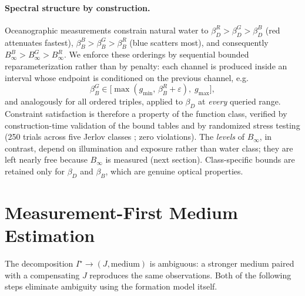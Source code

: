\documentclass[11pt,a4paper]{article}
\newcommand{\Binf}{B_\infty}
\newcommand{\J}{J}
\newcommand{\I}{I}
\begin{document}
\paragraph{Spectral structure by construction.}
Oceanographic measurements \cite{jerlov1976marine} constrain natural water to $\beta_D^R > \beta_D^G > \beta_D^B$ (red attenuates fastest), $\beta_B^B > \beta_B^G > \beta_B^R$ (blue scatters most), and consequently $\Binf^B > \Binf^G > \Binf^R$. We enforce these orderings by sequential bounded reparameterization rather than by penalty: each channel is produced inside an interval whose endpoint is conditioned on the previous channel, e.g.
\begin{equation}
    \beta_B^G \in \big[\max(g_{\min},\, \beta_B^R + \varepsilon),\; g_{\max}\big],
\end{equation}
and analogously for all ordered triples, applied to $\beta_D$ at \emph{every} queried range. Constraint satisfaction is therefore a property of the function class, verified by construction-time validation of the bound tables and by randomized stress testing (250 trials across five Jerlov classes \cite{jerlov1976marine}; zero violations). The \emph{levels} of $\Binf$, in contrast, depend on illumination and exposure rather than water class; they are left nearly free because $\Binf$ is measured (next section). Class-specific bounds are retained only for $\beta_D$ and $\beta_B$, which are genuine optical properties.

\section{Measurement-First Medium Estimation}
\label{sec:measurement}

The decomposition $\I^\star \to (\J, \text{medium})$ is ambiguous: a stronger medium paired with a compensating $\J$ reproduces the same observations. Both of the following steps eliminate ambiguity using the formation model itself.
\end{document}
